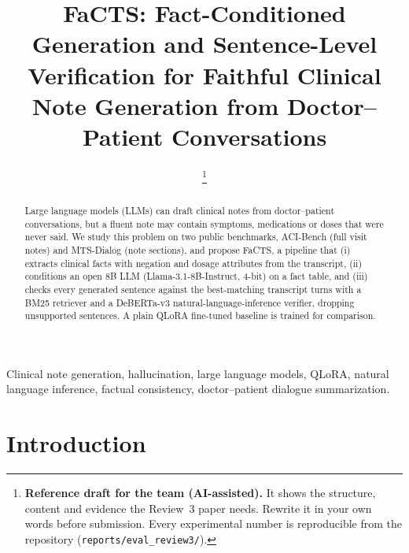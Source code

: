 \documentclass[conference]{IEEEtran}
\begin{document}
\title{FaCTS: Fact-Conditioned Generation and Sentence-Level Verification for Faithful Clinical Note Generation from Doctor--Patient Conversations}

\author{
\thanks{\textbf{Reference draft for the team (AI-assisted).} It shows the structure, content and evidence the
Review~3 paper needs. Rewrite it in your own words before submission. Every experimental number is
reproducible from the repository (\texttt{reports/eval\_review3/}).}}

\maketitle

\begin{abstract}
Large language models (LLMs) can draft clinical notes from doctor--patient conversations, but a fluent
note may contain symptoms, medications or doses that were never said. We study this problem on two public
benchmarks, ACI-Bench (full visit notes) and MTS-Dialog (note sections), and propose FaCTS, a pipeline that
(i) extracts clinical facts with negation and dosage attributes from the transcript, (ii) conditions an
open 8B LLM (Llama-3.1-8B-Instruct, 4-bit) on a fact table, and (iii) checks every generated sentence
against the best-matching transcript turns with a BM25 retriever and a DeBERTa-v3 natural-language-inference
verifier, dropping unsupported sentences. A plain QLoRA fine-tuned baseline is trained for comparison.

\end{abstract}

\begin{IEEEkeywords}
Clinical note generation, hallucination, large language models, QLoRA, natural language inference,
factual consistency, doctor--patient dialogue summarization.
\end{IEEEkeywords}

\section{Introduction}
\end{document}
